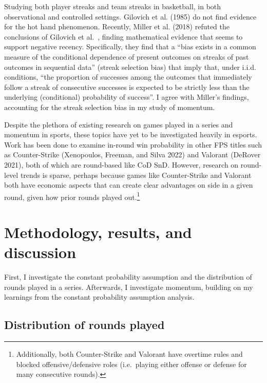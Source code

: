 \documentclass{article}
\begin{document}
Studying both player streaks and team streaks in basketball, in both
observational and controlled settings. Gilovich et al. (1985) do not
find evidence for the hot hand phenomenon. Recently, Miller et al.
(2018) refuted the conclusions of Gilovich et al.~, finding mathematical
evidence that seems to support negative recency. Specifically, they find
that a ``bias exists in a common measure of the conditional dependence
of present outcomes on streaks of past outcomes in sequential data''
(streak selection bias) that imply that, under i.i.d. conditions, ``the
proportion of successes among the outcomes that immediately follow a
streak of consecutive successes is expected to be strictly less than the
underlying (conditional) probability of success''. I agree with Miller's
findings, accounting for the streak selection bias in my study of
momentum.

Despite the plethora of existing research on games played in a series
and momentum in sports, these topics have yet to be investigated heavily
in esports. Work has been done to examine in-round win probability in
other FPS titles such as Counter-Strike (Xenopoulos, Freeman, and Silva
2022) and Valorant (DeRover 2021), both of which are round-based like
CoD SnD. However, research on round-level trends is sparse, perhaps
because games like Counter-Strike and Valorant both have economic
aspects that can create clear advantages on side in a given round, given
how prior rounds played out.\footnote{Additionally, both Counter-Strike
  and Valorant have overtime rules and blocked offensive/defensive roles
  (i.e.~playing either offense or defense for many consecutive rounds).}

\hypertarget{methodology-results-and-discussion}{%
\section{Methodology, results, and
discussion}\label{methodology-results-and-discussion}}

First, I investigate the constant probability assumption and the
distribution of rounds played in a series. Afterwards, I investigate
momentum, building on my learnings from the constant probability
assumption analysis.

\hypertarget{sec:analysis-1}{%
\subsection{Distribution of rounds played}\label{sec:analysis-1}}
\end{document}
